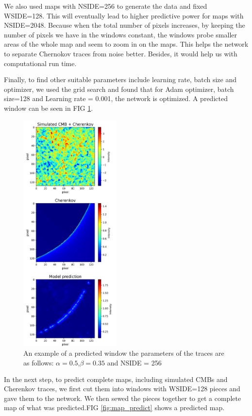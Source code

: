 \documentclass[10pt, english, pra,aps,twocolumn,floatfix,superscriptaddress]{revtex4-2}
\begin{document}
 We also used maps with NSIDE=256 to generate the data and fixed WSIDE=128. This will eventually lead to higher predictive power for maps with NSIDE=2048. Because when the total number of pixels increases, by keeping the number of pixels we have in the windows constant, the windows probe smaller areas of the whole map and seem to zoom in on the maps. This helps the network to separate Chernokov traces from noise better. Besides, it would help us with computational run time.
 
 Finally, to find other suitable parameters include learning rate, batch size and optimizer, we used the grid search and found that for Adam optimizer, batch size=128 and Learning rate = 0.001, the network is optimized. A predicted window can be seen in FIG \ref{fig:W_predict}.
 
  \begin{figure}
    \centering
    \includegraphics[width=0.45\textwidth]{sample_predict.png}
    \caption{An example of a predicted window the parameters of the traces are as follows: $\alpha=0.5$,$\beta=0.35$ and NSIDE = 256}
    \label{fig:W_predict}
\end{figure}
 
 In the next step, to predict complete maps, including simulated CMBs and Cherenkov traces, we first cut them into windows with WSIDE=128 pieces and gave them to the network. We then sewed the pieces together to get a complete map of what was predicted.FIG \ref{fig:map_predict} shows a predicted map.
 
\end{document}
